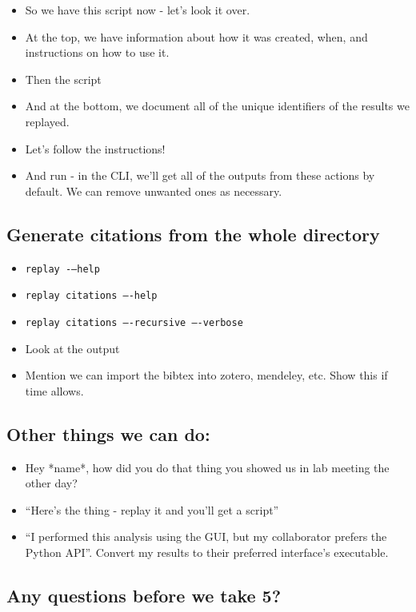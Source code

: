 \begin{itemize}
    \item So we have this script now - let’s look it over.
    \item At the top, we have information about how it was created, when, and instructions on how to use it.
    \item Then the script
    \item And at the bottom, we document all of the unique identifiers of the results we replayed.
    \item Let’s follow the instructions!
    \item And run - in the CLI, we’ll get all of the outputs from these actions by default. We can remove unwanted ones as necessary.
\end{itemize}

\subsection*{Generate citations from the whole directory}

\begin{itemize}
    \item \texttt{replay -–help}
    \item \texttt{replay citations –-help}
    \item \texttt{replay citations –-recursive –-verbose}
    \item Look at the output
    \item Mention we can import the bibtex into zotero, mendeley, etc. Show this if time allows.
\end{itemize}

\subsection*{Other things we can do:}

\begin{itemize}
    \item Hey *name*, how did you do that thing you showed us in lab meeting the other day?
    \item “Here’s the thing - replay it and you’ll get a script”
    \item “I performed this analysis using the GUI, but my collaborator prefers the Python API”. Convert my results to their preferred interface’s executable.
\end{itemize}

\subsection*{Any questions before we take 5?}

